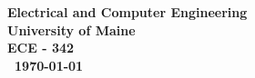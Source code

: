\documentclass{article}
\begin{document}
\begin{titlepage}
\begin{center}
\begin{abstract}
        
        
        
        \end{abstract}
        
        
        \vspace{02.5cm}
        \textbf{
        Electrical and Computer Engineering\\
        University of Maine\\
        ECE - 342\\\ \today}
    \vspace{.5cm}
    
    \end{center}
\end{titlepage}


\tableofcontents

\newpage

\newpage
\listoffigures
\listoftables
\newpage 
\clearpage

\end{document}
